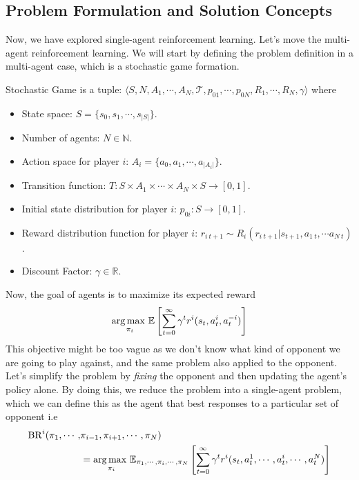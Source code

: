 \label{sec:chap2-multi-agent-rl}

\subsection{Problem Formulation and Solution Concepts}
\label{sec:chap2-formulation-concepts}
Now, we have explored single-agent reinforcement learning. Let's move the multi-agent reinforcement learning. We will start by defining the problem definition in a multi-agent case, which is a stochastic game \cite{shapley1953stochastic} formation. 
\begin{definition}
Stochastic Game is a tuple: $\langle S, N, A_1, \cdots, A_N, \mathcal{T}, p_{01}, \cdots, p_{0N}, R_1, \cdots, R_N, \gamma \rangle$ where 
\begin{itemize}
    \item State space: $S = \{s_0, s_1, \cdots , s_{|S|}\}$. 
    \item Number of agents: $N \in \mathbb{N}$. 
    \item Action space for player $i$: $A_i = \{a_0, a_1, \cdots, a_{|A_i|}\}$. 
    \item Transition function: $T : S \times A_1 \times \cdots \times A_N \times S \rightarrow [0, 1]$.  
    \item Initial state distribution for player $i$: $p_{0i}: S \rightarrow [0, 1]$. 
    \item Reward distribution function for player $i$: $r_{i \ t+1} \sim R_i(r_{i \ t+1} | s_{t+1}, a_{1 \ t}, \cdots a_{N \ t})$.
    \item Discount Factor: $\gamma \in \mathbb{R}$. 
\end{itemize}
\end{definition}
\noindent
Now, the goal of agents is to maximize its expected reward
\begin{equation}
    \underset{\pi_i}{\arg\max \ } \mathbb{E}\left[ \sum^\infty_{t=0} \gamma ^t r^i(s_t, a^i_t, a^{-i}_t)  \right] 
\end{equation}
This objective might be too vague as we don't know what kind of opponent we are going to play against, and the same problem also applied to the opponent. Let's simplify the problem by \textit{fixing} the opponent and then updating the agent's policy alone. By doing this, we reduce the problem into a single-agent problem, which we can define this as the agent that best responses to a particular set of opponent i.e 
\begin{equation}
\begin{aligned}
    \operatorname{BR}^i(\pi_1, \cdots, &\pi_{i-1}, \pi_{i+1}, \cdots, \pi_N) \\
    &= \underset{\pi_i}{\arg\max \ } \mathbb{E}_{\pi_1, \cdots , \pi_i, \cdots, \pi_N}\left[ \sum^\infty_{t=0} \gamma ^t r^i(s_t, a^1_t, \cdots, a^i_t, \cdots, a^{N}_t)  \right]
\end{aligned}
\end{equation}
